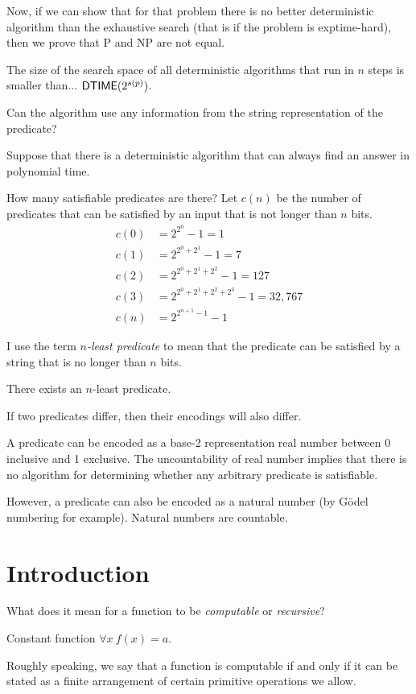 Now, if we can show that for that problem
there is no better deterministic algorithm than the exhaustive search
(that is if the problem is exptime-hard),
then we prove that P and NP are not equal.

The size of the search space of all deterministic algorithms
that run in $n$ steps is smaller than...
$\operatorname{\mathsf{DTIME}}(2^{s(p)})$.

Can the algorithm use any information from
the string representation of the predicate?

Suppose that there is a deterministic algorithm that can
always find an answer in polynomial time.

How many satisfiable predicates are there?
Let $c(n)$ be the number of predicates that can be satisfied
by an input that is not longer than $n$ bits.
\begin{align}
    c(0) &= 2^{2^0} - 1 = 1
    \\
    c(1) &= 2^{2^0 + 2^1} - 1 = 7
    \\
    c(2) &= 2^{2^0 + 2^1 + 2^2} - 1 = 127
    \\
    c(3) &= 2^{2^0 + 2^1 + 2^2 + 2^3} - 1 = 32,767
    \\
    c(n) &= 2^{2^{n+1}-1} - 1
\end{align}

I use the term \emph{$n$-least predicate} to mean that the predicate
can be satisfied by a string that is no longer than $n$ bits.

There exists an $n$-least predicate.

If two predicates differ, then their encodings will also differ.

A predicate can be encoded as a base-2 representation real number
between 0 inclusive and 1 exclusive.
The uncountability of real number implies that there is no algorithm
for determining whether any arbitrary predicate is satisfiable.

However, a predicate can also be encoded as a natural number
(by G\"odel numbering for example).
Natural numbers are countable.

\section{Introduction}

What does it mean for a function to be \emph{computable} or \emph{recursive}?

Constant function $\forall x ~ f(x) = a$.

Roughly speaking, we say that a function is computable
if and only if it can be stated as a finite arrangement
of certain primitive operations we allow.

